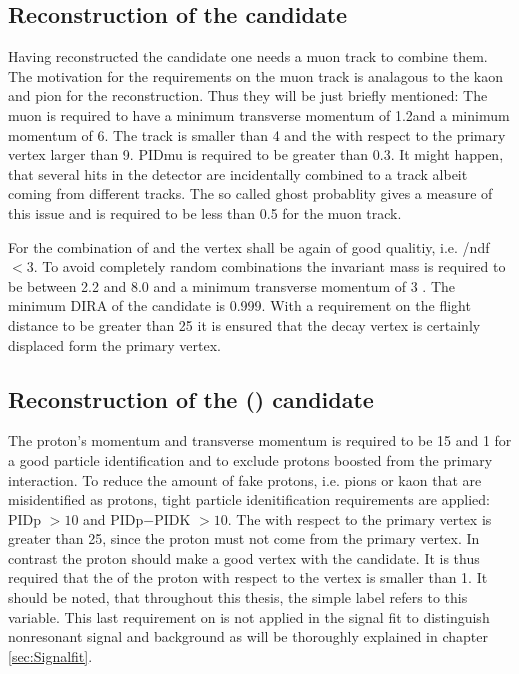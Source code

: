 \subsection{Reconstruction of the \Dz\mun candidate}
\label{sec:Selection_D0mu}
Having reconstructed the \Dz candidate one needs a muon track to combine them.
The motivation for the requirements on the muon track is analagous to the kaon and pion for the \Dz reconstruction.
Thus they will be just briefly mentioned:
The muon is required to have a minimum transverse momentum of 1.2\gev and a minimum momentum of 6\gev.
The track \chisqndf is smaller than 4 and the \chisqip with respect to the primary vertex larger than 9.
PIDmu is required to be greater than 0.3.
It might happen, that several hits in the detector are incidentally combined to a track albeit coming from different tracks.
The so called ghost probablity gives a measure of this issue and is required to be less than 0.5 for the muon track.

For the combination of \Dz and \mun the vertex shall be again of good qualitiy, i.e. \chisqvtx/ndf $<3$.
To avoid completely random combinations the invariant \Dz\mun mass is required to be between 2.2 and 8.0 \gev and a minimum transverse momentum of 3 \gev.
The minimum DIRA of the \Dz\mun candidate is 0.999.
With a requirement on the flight distance \chisq to be greater than 25 it is ensured that the \Dz\mun decay vertex is certainly displaced form the primary vertex.

\subsection{Reconstruction of the \Lb (\Dz\mun\proton) candidate}
The proton's momentum and transverse momentum is required to be 15 \gev and 1 \gev for a good particle identification and to exclude protons boosted from the primary interaction.
To reduce the amount of fake protons, i.e. pions or kaon that are misidentified as protons, tight particle idenitification requirements are applied: PIDp $> 10$ and PIDp$-$PIDK $> 10$.
The \chisqip with respect to the primary vertex is greater than 25, since the proton must not come from the primary vertex.
In contrast the proton should make a good vertex with the \Dz\mun candidate.
It is thus required that the \logIP of the proton with respect to the \Dz\mun vertex is smaller than 1.
It should be noted, that throughout this thesis, the simple label \logIP refers to this variable.
This last requirement on \logIP is not applied in the signal fit to distinguish nonresonant signal and background as will be thoroughly explained in chapter \ref{sec:Signalfit}.

